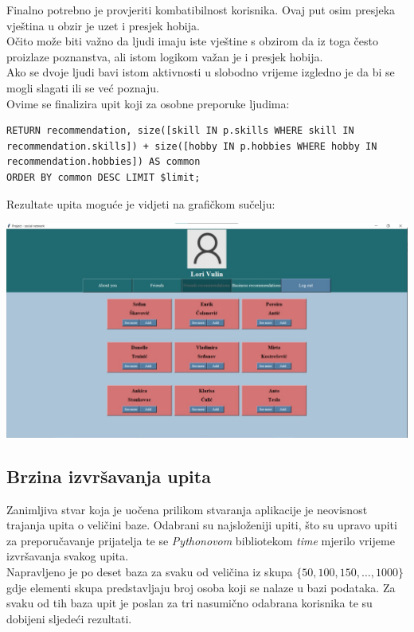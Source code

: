 \documentclass[titlepage, 12pt]{scrartcl}
\begin{document}
Finalno potrebno je provjeriti kombatibilnost korisnika. Ovaj put osim presjeka vještina u obzir je uzet i presjek hobija. \\
Očito može biti važno da ljudi imaju iste vještine s obzirom da iz toga često proizlaze poznanstva, ali istom logikom važan je i presjek hobija. \\
Ako se dvoje ljudi bavi istom aktivnosti u slobodno vrijeme izgledno je da bi se mogli slagati ili se već poznaju. \\
Ovime se finalizira upit koji za osobne preporuke ljudima:
\begin{samepage}
\begin{verbatim}
RETURN recommendation, size([skill IN p.skills WHERE skill IN recommendation.skills]) + size([hobby IN p.hobbies WHERE hobby IN recommendation.hobbies]) AS common 
ORDER BY common DESC LIMIT $limit;

\end{verbatim}
\end{samepage}
\newpage
\begin{samepage}
Rezultate upita moguće je vidjeti na grafičkom sučelju:
\begin{center}
    \includegraphics[scale=0.19]{slike/personal.jpg}
\end{center}
\end{samepage}

\subsection{Brzina izvršavanja upita}
Zanimljiva stvar koja je uočena prilikom stvaranja aplikacije je neovisnost trajanja upita o veličini baze. Odabrani su najsloženiji upiti, što su upravo upiti za preporučavanje prijatelja te se \emph{Pythonovom} bibliotekom \emph{time} mjerilo vrijeme izvršavanja svakog upita. \\
Napravljeno je po deset baza za svaku od veličina iz skupa $\{50, 100, 150, \dots, 1000\}$ gdje elementi skupa predstavljaju broj osoba koji se nalaze u bazi podataka. Za svaku od tih baza upit je poslan za tri nasumično odabrana korisnika te su dobijeni sljedeći rezultati.\\
\end{document}
